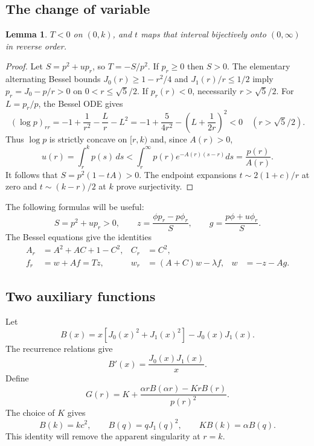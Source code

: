 \documentclass[11pt]{article}
\newtheorem{lemma}[theorem]{Lemma}
\theoremstyle{remark}
\begin{document}
\subsection{The change of variable}
\begin{lemma}
$T<0$ on $(0,k)$, and $t$ maps that interval bijectively onto $(0,\infty)$
in reverse order.
\end{lemma}
\begin{proof}
Let $S=p^2+up_r$, so $T=-S/p^2$. If $p_r\ge0$ then $S>0$.
The elementary alternating Bessel bounds
$J_0(r)\ge1-r^2/4$ and $J_1(r)/r\le1/2$ imply
$p_r=J_0-p/r>0$ on $0<r\le\sqrt5/2$.
If $p_r(r)<0$, necessarily $r>\sqrt5/2$. For $L=p_r/p$, the Bessel
ODE gives
\[
 (\log p)_{rr}
 =-1+\frac1{r^2}-\frac Lr-L^2
 =-1+\frac5{4r^2}-\left(L+\frac1{2r}\right)^2<0
 \quad(r>\sqrt5/2).
\]
Thus $\log p$ is strictly concave on $[r,k)$ and, since
$A(r)>0$,
\[
 u(r)=\int_r^k p(s)\,ds
 <\int_r^\infty p(r)e^{-A(r)(s-r)}ds=\frac{p(r)}{A(r)}.
\]
It follows that $S=p^2(1-tA)>0$. The endpoint expansions
$t\sim2(1+c)/r$ at zero and $t\sim(k-r)/2$ at $k$ prove surjectivity.
\end{proof}

The following formulas will be useful:
\begin{equation}
 S=p^2+up_r>0,\qquad
 z=\frac{\phi p_r-p\phi_r}{S},\qquad
 g=\frac{p\phi+u\phi_r}{S}.
\end{equation}
The Bessel equations give the identities
\begin{align}
 A_r&=A^2+AC+1-C^2,& C_r&=C^2,\label{riccati}\\
 f_r&=w+Af=Tz,&w_r&=(A+C)w-\lambda f,
 &w&=-z-Ag.\label{fw}
\end{align}

\subsection{Two auxiliary functions}
Let
\[
 B(x)=x[J_0(x)^2+J_1(x)^2]-J_0(x)J_1(x).
\]
The recurrence relations give
\[
 B'(x)=\frac{J_0(x)J_1(x)}x.
\]
Define
\begin{equation}\label{Gclosed}
 G(r)=K+\frac{\alpha rB(\alpha r)-KrB(r)}{p(r)^2}.
\end{equation}
The choice of $K$ gives
\[
 B(k)=kc^2,\qquad B(q)=qJ_1(q)^2,\qquad KB(k)=\alpha B(q).
\]
This identity will remove the apparent singularity at $r=k$.
\end{document}
